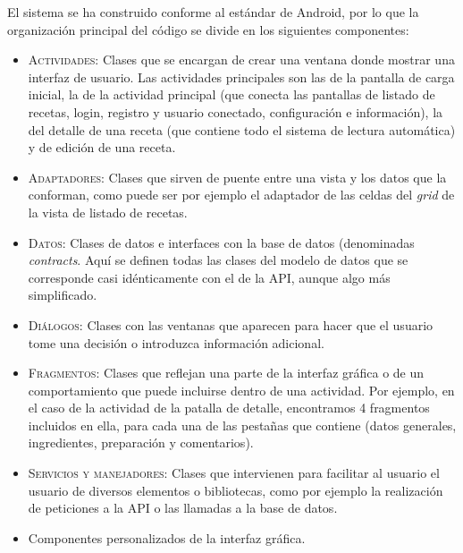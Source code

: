 \documentclass[a4paper,12pt]{article}
\begin{document}
El sistema se ha construido conforme al estándar de
Android,\cite{learning-android} por lo que la organización principal del código
se divide en los siguientes componentes:
\begin{itemize}
\item \textsc{Actividades}: Clases que se encargan de crear una ventana donde mostrar una
  interfaz de usuario. Las actividades principales son las de la pantalla de
  carga inicial, la de la actividad principal (que conecta las pantallas de
  listado de recetas, login, registro y usuario conectado, configuración e
  información), la del detalle de una receta (que contiene todo el sistema de
  lectura automática) y de edición de una receta.
\item \textsc{Adaptadores}: Clases que sirven de puente entre una vista y los datos que
  la conforman, como puede ser por ejemplo el adaptador de las celdas del
  \textit{grid} de la vista de listado de recetas.
\item \textsc{Datos}: Clases de datos e interfaces con la base de datos (denominadas
  \textit{contracts}. Aquí se definen todas las clases del modelo de datos
  que se corresponde casi idénticamente con el de la API, aunque algo más
  simplificado.
\item \textsc{Diálogos}: Clases con las ventanas que aparecen para hacer que el usuario
  tome una decisión o introduzca información adicional.
\item \textsc{Fragmentos}: Clases que reflejan una parte de la interfaz gráfica o de un
  comportamiento que puede incluirse dentro de una actividad. Por ejemplo, en
  el caso de la actividad de la patalla de detalle, encontramos 4 fragmentos
  incluidos en ella, para cada una de las pestañas que contiene (datos generales,
  ingredientes, preparación y comentarios).
\item \textsc{Servicios y manejadores}: Clases que intervienen para facilitar al usuario
  el usuario de diversos elementos o bibliotecas, como por ejemplo la realización
  de peticiones a la API o las llamadas a la base de datos.
\item Componentes personalizados de la interfaz gráfica.
\end{itemize}
\end{document}
